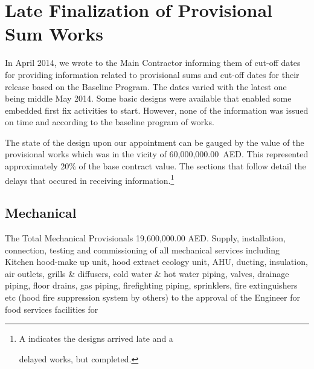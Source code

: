 \def\hot{{\color{red}\scalebox{1.5}{\Fire}} delayed works. }
\def\ghot{{\color{green!80!black}\raggedright\scalebox{1.5}{\Fire}} delayed works, but completed. }
\def\phot{{\color{green!80!black}\raggedright\scalebox{1.5}{\Fire}} delayed works. partially completed. }

\def\check{{$\color{green!80!black}\check$}}
\def\partiald {50\% complete}
\def\unavailable{\hot Design unavailable}

\chapter{Late Finalization of Provisional Sum Works}

In April 2014, we wrote to the Main Contractor informing them of cut-off dates for providing information related to provisional sums and cut-off dates for their release based on the Baseline Program. The dates varied with the latest one being middle May 2014. Some basic designs were available that enabled some embedded first fix activities to start. However, none of the information was issued on time and according to the baseline program of works. 

The state of the design upon our appointment can be gauged by the value of the provisional works which was in the vicity of 60,000,000.00~AED. This represented approximately 20\% of the base contract value. The sections that follow detail the delays that occured in receiving information.\footnote{A \textcolor{red}{\Fire} indicates the designs arrived late and a \ghot}

\section{Mechanical}

The Total Mechanical Provisionals 19,600,000.00 AED.  Supply, installation, connection, testing and commissioning of all mechanical services including Kitchen hood-make up unit, hood extract ecology unit, AHU, ducting, insulation, air outlets, grills \& diffusers, cold water \& hot water piping, valves, drainage piping, floor drains, gas piping, firefighting piping, sprinklers, fire extinguishers etc (hood fire suppression system by others) to the approval of the Engineer for food services facilities for
\medskip

